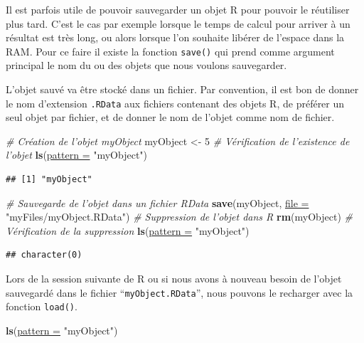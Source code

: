 \documentclass[twoside,symmetric]{book}
\newenvironment{Shaded}{}{}
\newcommand{\CommentTok}[1]{\textit{#1}}
\newcommand{\DataTypeTok}[1]{\underline{#1}}
\newcommand{\DecValTok}[1]{#1}
\newcommand{\KeywordTok}[1]{\textbf{#1}}
\newcommand{\NormalTok}[1]{#1}
\newcommand{\StringTok}[1]{#1}
\begin{document}
Il est parfois utile de pouvoir sauvegarder un objet R pour pouvoir le réutiliser plus tard. C'est le cas par exemple lorsque le temps de calcul pour arriver à un résultat est très long, ou alors lorsque l'on souhaite libérer de l'espace dans la RAM. Pour ce faire il existe la fonction \texttt{save()} qui prend comme argument principal le nom du ou des objets que nous voulons sauvegarder.

L'objet sauvé va être stocké dans un fichier. Par convention, il est bon de donner le nom d'extension \texttt{.RData} aux fichiers contenant des objets R, de préférer un seul objet par fichier, et de donner le nom de l'objet comme nom de fichier.

\begin{Shaded}
\begin{Highlighting}[]
\CommentTok{# Création de l'objet myObject}
\NormalTok{myObject <-}\StringTok{ }\DecValTok{5}
\CommentTok{# Vérification de l'existence de l'objet}
\KeywordTok{ls}\NormalTok{(}\DataTypeTok{pattern =} \StringTok{"myObject"}\NormalTok{)}
\end{Highlighting}
\end{Shaded}

\begin{verbatim}
## [1] "myObject"
\end{verbatim}

\begin{Shaded}
\begin{Highlighting}[]
\CommentTok{# Sauvegarde de l'objet dans un fichier RData}
\KeywordTok{save}\NormalTok{(myObject, }\DataTypeTok{file =} \StringTok{"myFiles/myObject.RData"}\NormalTok{)}
\CommentTok{# Suppression de l'objet dans R}
\KeywordTok{rm}\NormalTok{(myObject)}
\CommentTok{# Vérification de la suppression}
\KeywordTok{ls}\NormalTok{(}\DataTypeTok{pattern =} \StringTok{"myObject"}\NormalTok{)}
\end{Highlighting}
\end{Shaded}

\begin{verbatim}
## character(0)
\end{verbatim}

Lors de la session suivante de R ou si nous avons à nouveau besoin de l'objet sauvegardé dans le fichier ``\texttt{myObject.RData}'', nous pouvons le recharger avec la fonction \texttt{load()}.

\begin{Shaded}
\begin{Highlighting}[]
\KeywordTok{ls}\NormalTok{(}\DataTypeTok{pattern =} \StringTok{"myObject"}\NormalTok{)}
\end{Highlighting}
\end{Shaded}
\end{document}
